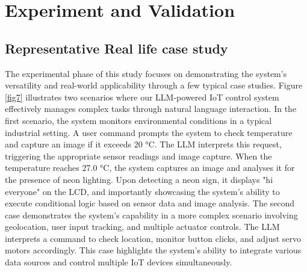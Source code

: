 \documentclass{ieeeaccess}
\begin{document}
\section{Experiment and Validation}\label{sec:experiment}

\subsection{Representative Real life case study}
The experimental phase of this study focuses on demonstrating the system's versatility and real-world applicability through a few typical case studies. Figure \ref{fig7} illustrates two scenarios where our LLM-powered IoT control system effectively manages complex tasks through natural language interaction. In the first scenario, the system monitors environmental conditions in a typical industrial setting. A user command prompts the system to check temperature and capture an image if it exceeds 20 °C. The LLM interprets this request, triggering the appropriate sensor readings and image capture. When the temperature reaches 27.0 °C, the system captures an image and analyses it for the presence of neon lighting. Upon detecting a neon sign, it displays "hi everyone" on the LCD, and importantly showcasing the system's ability to execute conditional logic based on sensor data and image analysis. The second case demonstrates the system's capability in a more complex scenario involving geolocation, user input tracking, and multiple actuator controls. The LLM interprets a command to check location, monitor button clicks, and adjust servo motors accordingly. This case highlights the system's ability to integrate various data sources and control multiple IoT devices simultaneously.
\end{document}
